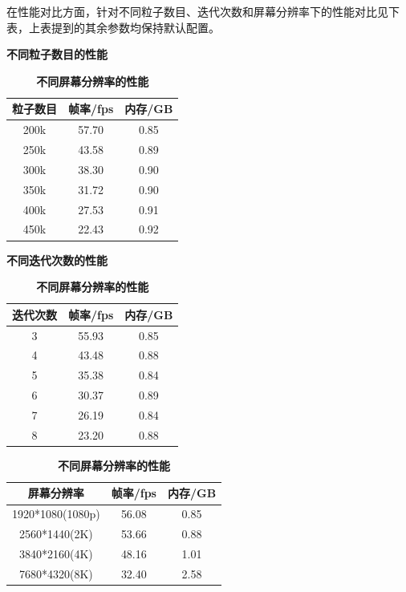 在性能对比方面，针对不同粒子数目、迭代次数和屏幕分辨率下的性能对比见下表，上表提到的其余参数均保持默认配置。
\begin{table}[H]
    \centering
    \begin{minipage}{0.5\textwidth}
        \caption{\textbf{不同粒子数目的性能}}
        \label{tab:particleCount}
        \centering
        \begin{tabular}{ccc}
            \toprule
            粒子数目 & 帧率/fps & 内存/GB \\
            \midrule
            200k & 57.70 & 0.85 \\
            250k & 43.58 & 0.89 \\
            300k & 38.30 & 0.90 \\
            350k & 31.72 & 0.90 \\
            400k & 27.53 & 0.91 \\
            450k & 22.43 & 0.92 \\
            \bottomrule
        \end{tabular}
    \end{minipage}\hfill
    \begin{minipage}{0.5\textwidth}
        \caption{\textbf{不同迭代次数的性能}}
        \label{tab:iterationCount}
        \centering
        \begin{tabular}{ccc}
            \toprule
            迭代次数 & 帧率/fps & 内存/GB \\
            \midrule
            3 & 55.93 & 0.85 \\
            4 & 43.48 & 0.88 \\
            5 & 35.38 & 0.84 \\
            6 & 30.37 & 0.89 \\
            7 & 26.19 & 0.84 \\
            8 & 23.20 & 0.88 \\
            \bottomrule
        \end{tabular}
    \end{minipage}
    \begin{minipage}{\textwidth}
        \caption{\textbf{不同屏幕分辨率的性能}}
        \label{tab:resolution}
        \centering
        \begin{tabular}{ccc}
            \toprule
            屏幕分辨率 & 帧率/fps & 内存/GB \\
            \midrule
            1920*1080(1080p) & 56.08 & 0.85 \\
            2560*1440(2K) & 53.66 & 0.88 \\
            3840*2160(4K) & 48.16 & 1.01 \\
            7680*4320(8K) & 32.40 & 2.58 \\
            \bottomrule
        \end{tabular}
    \end{minipage}
\end{table}


